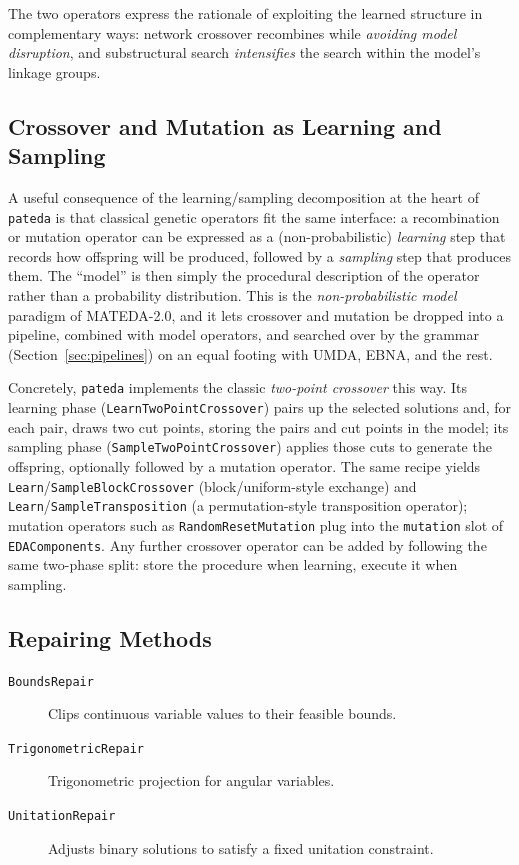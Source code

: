 \documentclass[a4paper,11pt]{article}
\begin{document}
The two operators express the rationale of exploiting the learned structure in complementary ways: network crossover recombines while \emph{avoiding model disruption}, and substructural search \emph{intensifies} the search within the model's linkage groups.

\subsection{Crossover and Mutation as Learning and Sampling}
\label{sec:crossover_as_model}

A useful consequence of the learning/sampling decomposition at the heart of
\texttt{pateda} is that classical genetic operators fit the same interface: a
recombination or mutation operator can be expressed as a (non-probabilistic)
\emph{learning} step that records how offspring will be produced, followed by a
\emph{sampling} step that produces them. The ``model'' is then simply the
procedural description of the operator rather than a probability distribution.
This is the \emph{non-probabilistic model} paradigm of MATEDA-2.0, and it lets
crossover and mutation be dropped into a pipeline, combined with model operators,
and searched over by the grammar (Section~\ref{sec:pipelines}) on an equal
footing with UMDA, EBNA, and the rest.

Concretely, \texttt{pateda} implements the classic \emph{two-point crossover}
this way. Its learning phase (\texttt{LearnTwoPointCrossover}) pairs up the
selected solutions and, for each pair, draws two cut points, storing the pairs
and cut points in the model; its sampling phase
(\texttt{SampleTwoPointCrossover}) applies those cuts to generate the offspring,
optionally followed by a mutation operator. The same recipe yields
\texttt{Learn}/\texttt{SampleBlockCrossover} (block/uniform-style exchange) and
\texttt{Learn}/\texttt{SampleTransposition} (a permutation-style transposition
operator); mutation operators such as \texttt{RandomResetMutation} plug into the
\texttt{mutation} slot of \texttt{EDAComponents}. Any further crossover operator
can be added by following the same two-phase split: store the procedure when
learning, execute it when sampling.

\subsection{Repairing Methods}

\begin{description}
  \item[\texttt{BoundsRepair}]
    Clips continuous variable values to their feasible bounds.

  \item[\texttt{TrigonometricRepair}]
    Trigonometric projection for angular variables.

  \item[\texttt{UnitationRepair}]
    Adjusts binary solutions to satisfy a fixed unitation constraint.
\end{description}
\end{document}
